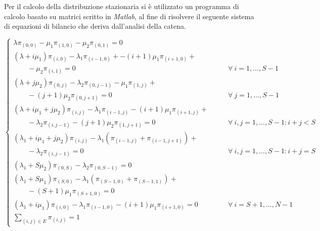 Per il calcolo della distribuzione stazionaria si è utilizzato un programma di
calcolo basato su matrici scritto in \emph{Matlab}, al fine di risolvere il
seguente sistema di equazioni di bilancio che deriva dall'analisi della catena.

\begin{displaymath}
\left\{ \begin{array}{ll}

\lambda \pi_{(0,0)} - \mu_1 \pi_{(1,0)} -\mu_{2} \pi_{(0,1)} = 0 & \\[4pt]

(\lambda+i\mu_1)\pi_{(i,0)} - \lambda_1\pi_{(i-1,0)} + - (i+1)\mu_1\pi_{(i+1,0)}
+ &\\
\qquad - \mu_2\pi_{(i,1)} = 0 & 
\qquad \forall \ i = 1, \ldots, S-1  \\[4pt]  

(\lambda+j\mu_2)\pi_{(0,j)} - \lambda_2\pi_{(0,j-1)} - \mu_1\pi_{(1,j)} + &\\
\qquad-(j+1)\mu_2\pi_{(0,j+1)} = 0 & 
\qquad \forall \ j = 1, \ldots, S-1 \\[4pt]

(\lambda+i\mu_1+j\mu_2)\pi_{(i,j)} - \lambda_1\pi_{(i-1,j)} -
(i+1)\mu_1\pi_{(i+1,j)}+ &\\
\qquad - \lambda_2\pi_{(i,j-1)} -(j+1)\mu_2\pi_{(1,j+1)} = 0 & \qquad \forall \
  i,j=1,\ldots,S-1 : i+j < S \\[4pt]

(\lambda_1+i\mu_1+j\mu_2)\pi_{(i,j)} - \lambda_1(\pi_{(i-1,j)}+\pi_{(i-1,j+1)})
+ &\\
\qquad - \lambda_2\pi_{(i,j-1)} = 0 & 
\qquad \forall \ i,j=1,\ldots,S-1 : i+j = S \\[4pt]

(\lambda_1+S\mu_2)\pi_{(0,S)} - \lambda_2\pi_{(0,S-1)} = 0 & \\[4pt]

(\lambda_1+S\mu_1)\pi_{(S,0)} - \lambda_1(\pi_{(S-1,0)}+\pi_{(S-1,1)}) + &\\
\qquad -(S+1)\mu_1\pi_{(S+1,0)} = 0 & \\[4pt]

(\lambda_1+i\mu_1)\pi_{(i,0)} - \lambda_1\pi_{(i-1,0)} - (i+1)\mu_1\pi_{(i+1,0)}
= 0 & \qquad \forall \ i = S+1,\ldots,N-1 \\[4pt]

\sum_{(i,j) \in E} \pi_{(i,j)} = 1 & 

\end{array} \right .
\end{displaymath}

